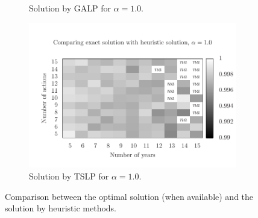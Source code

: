 \begin{figure}
\begin{subfigure}{0.45\textwidth}
    \caption{Solution by GALP for $\alpha=1.0$.}
    \label{fig:mh1_3}
  \end{subfigure}
  \hspace{1cm}
  \begin{subfigure}{0.45\textwidth}
    \includegraphics[scale=0.5, trim=0.75cm 0.55cm 0 2cm, clip=true]{imgs/comp_easy_ts.pdf}
    \caption{Solution by TSLP for $\alpha=1.0$.}
    \label{fig:mh2_3}
  \end{subfigure}
  \caption{Comparison between the optimal solution (when available) 
  and the solution by heuristic methods.}
\end{figure}

